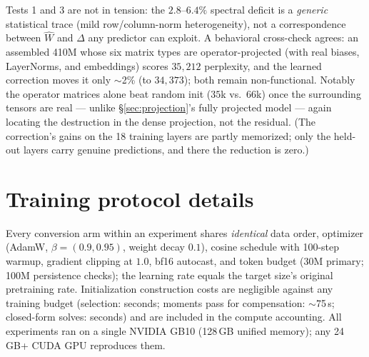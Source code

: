 Tests 1 and 3 are not in tension: the $2.8$--$6.4\%$ spectral deficit is a
\emph{generic} statistical trace (mild row/column-norm heterogeneity), not a
correspondence between $\hat{W}$ and $\Delta$ any predictor can exploit. A
behavioral cross-check agrees: an assembled 410M whose six matrix types are
operator-projected (with real biases, LayerNorms, and embeddings) scores
$35{,}212$ perplexity, and the learned correction moves it only $\sim$2\% (to
$34{,}373$); both remain non-functional. Notably the operator matrices alone beat
random init ($35$k vs.\ $66$k) once the surrounding tensors are real --- unlike
\S\ref{sec:projection}'s fully projected model --- again locating the destruction
in the dense projection, not the residual. (The correction's gains on the 18
training layers are partly memorized; only the held-out layers carry genuine
predictions, and there the reduction is zero.)

\section{Training protocol details}
\label{app:protocol}

Every conversion arm within an experiment shares \emph{identical} data order,
optimizer (AdamW, $\beta=(0.9,0.95)$, weight decay $0.1$), cosine schedule
with 100-step warmup, gradient clipping at $1.0$, bf16 autocast, and token
budget (30M primary; 100M persistence checks); the learning rate equals the
target size's original pretraining rate. Initialization construction costs
are negligible against any training budget (selection: seconds; moments pass
for compensation: $\sim$75\,s; closed-form solves: seconds) and are included
in the compute accounting. All experiments ran on a single NVIDIA GB10
(128\,GB unified memory); any 24\,GB+ CUDA GPU reproduces them.
